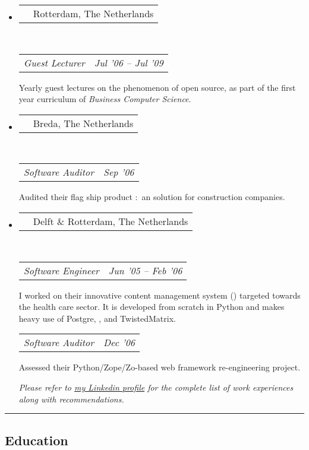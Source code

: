 \documentclass[10pt,a4paper]{article}
\makeatletter
\newcommand{\headerrow}[2]
{\begin{tabular*}{\linewidth}{l@{\extracolsep{\fill}}r}
	\textscale{1.08}{\textbf{#1}} &
	{\sc #2} \\
\end{tabular*}}
\newcommand{\subheaderrow}[2]
{\begin{tabular*}{\linewidth}{l@{\extracolsep{\fill}}r}
	\emph{#1} &
	\emph{#2} \\
\end{tabular*}}
\makeatother
\begin{document}
\begin{itemize}
	\item
	\headerrow
		{\href{http://www.eur.nl}{Erasmus University Rotterdam}}
		{Rotterdam, The Netherlands}
	\\
	\subheaderrow
		{Guest Lecturer}
    {Jul '06 -- Jul '09}
  Yearly guest lectures on the phenomenon of open source, as part of the first year curriculum of \emph{Business Computer Science}.

	\item
	\headerrow
		{LIP Automatisering}
		{Breda, The Netherlands}
	\\
	\subheaderrow
		{Software Auditor}
    {Sep '06}
  Audited their flag ship product :\ an  solution for construction companies.



	\item
	\headerrow
		{\href{http://www.thehealthagency.com}{The Health Agency}}
		{Delft \& Rotterdam, The Netherlands}
	\\
	\subheaderrow
		{Software Engineer}
    {Jun '05 -- Feb '06}
  {I worked on their innovative content management system () targeted towards the health care sector. It is developed from scratch in Python and makes heavy use of Postgre, ,  and TwistedMatrix.
  \vspace{0.2em}}
  \subheaderrow
    {Software Auditor}
    {Dec '06}
  Assessed their Python/Zope/Zo-based web framework re-engineering project.

\begin{center}
\emph{Please refer to \href{http://www.linkedin.com/in/ciesbreijs}{my Linkedin profile} for the complete list of work experiences along with recommendations.}
\end{center}

\end{itemize}


\hrule
\vspace{-0.4em}
\subsection*{Education}
\end{document}
